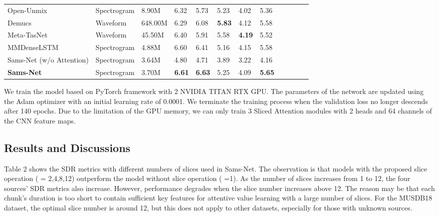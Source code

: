 \documentclass[a4paper]{article}
\begin{document}
\begin{table*}[!ht]
{\begin{center}
\begin{tabular}{llllllll}
Open-Unmix~\cite{stoter2019open}                       & Spectrogram            & 8.90M           & 6.32           & 5.73           & 5.23           & 4.02           & 5.36             \\
Demucs~\cite{Demucs2019}                           & Waveform          & 648.00M                & 6.29           & 6.08           & \textbf{5.83}  & 4.12           & 5.58             \\
Meta-TasNet~\cite{samuel2020meta}                      & Waveform         & 45.50M                 & 6.40            & 5.91           & 5.58           & \textbf{4.19}  & 5.52             \\
MMDenseLSTM~\cite{takahashi2018mmdenselstm}                      & Spectrogram       & 4.88M                & 6.60           & 6.41           & 5.16           & 4.15 & 5.58~ ~ ~ ~ ~ ~  \\
\midrule
Sams-Net (w/o Attention)               & Spectrogram          & 3.64M             & 4.80 & 4.71 & 3.89           & 3.22           & 4.16    \\
\midrule
\textbf{Sams-Net}                & Spectrogram          & 3.70M             & \textbf{6.61} & \textbf{6.63} & 5.25           & 4.09           & \textbf{5.65}    \\
\bottomrule
\end{tabular}
\end{center}}
\end{table*}

We train the model based on PyTorch framework \cite{paszke2019pytorch} with 2 NVIDIA TITAN RTX GPU. The parameters of the network are updated using the Adam optimizer \cite{kingma2014adam} with an initial learning rate of 0.0001. We terminate the training process when the validation loss no longer descends after 140 epochs. Due to the limitation of the GPU memory, we can only train 3 Sliced Attention modules with 2 heads and 64 channels of the CNN feature maps.

\subsection{Results and Discussions}
Table 2 shows the SDR metrics with different numbers of slices used in Sams-Net. The observation is that models with the proposed slice operation ( = 2,4,8,12) outperform the model without slice operation ( =1). As the number of slices increases from 1 to 12, the four sources' SDR metrics also increase. However, performance degrades when the slice number increases above 12. The reason may be that each chunk's duration is too short to contain sufficient key features for attentive value learning with a large number of slices. For the MUSDB18 dataset, the optimal slice number is around 12, but this does not apply to other datasets, especially for those with unknown sources.
\end{document}

